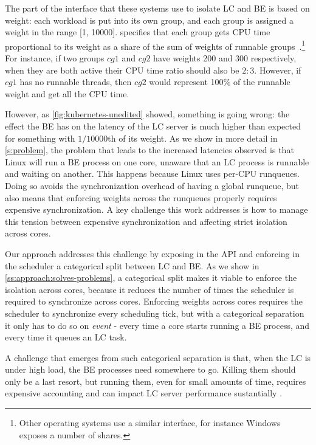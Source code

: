 The part of the \cgroups{} interface that these systems use to isolate LC and BE
is based on weight: each workload is put into its own group, and each group is
assigned a weight in the range [1, 10000]. \cgroups{} specifies that each group
gets CPU time proportional to its weight as a share of the sum of weights of
runnable groups~\cite{cgroups-kerneldocs}.\footnote{Other operating systems use
a similar interface, for instance Windows exposes a number of shares.} For
instance, if two groups $cg1$ and $cg2$ have weights 200 and 300 respectively,
when they are both active their CPU time ratio should also be $2:3$. However, if
$cg1$ has no runnable threads, then $cg2$ would represent 100\% of the runnable
weight and get all the CPU time.

However, as \autoref{fig:kubernetes-unedited} showed, something is going wrong:
the effect the BE has on the latency of the LC server is much higher than
expected for something with $1/10000$th of its weight. As we show in more detail
in \autoref{s:problem}, the problem that leads to the increased latencies
observed is that Linux will run a BE process on one core, unaware that an LC
process is runnable and waiting on another. This happens because Linux uses
per-CPU runqueues. Doing so avoids the synchronization overhead of having a
global runqueue, but also means that enforcing weights across the runqueues
properly requires expensive synchronization. A key challenge this work addresses
is how to manage this tension between expensive synchronization and affecting
strict isolation across cores.

Our approach addresses this challenge by exposing in the API and enforcing in
the scheduler a categorical split between LC and BE. As we show in
\autoref{ss:approach:solves-problems}, a categorical split makes it viable to
enforce the isolation across cores, because it reduces the number of times the
scheduler is required to synchronize across cores. Enforcing weights across
cores requires the scheduler to synchronize every scheduling tick, but with a
categorical separation it only has to do so on \textit{event} - every time a
core starts running a BE process, and every time it queues an LC task.

A challenge that emerges from such categorical separation is that, when the LC
is under high load, the BE processes need somewhere to go. Killing them should
only be a last resort, but running them, even for small amounts of time,
requires expensive accounting and can impact LC server performance sustantially
. 

